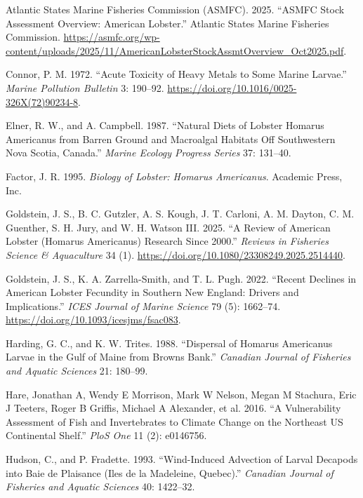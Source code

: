 \documentclass[
  letterpaper,
  DIV=11,
  numbers=noendperiod]{scrartcl}
\newlength{\cslhangindent}
\newenvironment{CSLReferences}[2] %
 {\begin{list}{}{%
  \setlength{\itemindent}{0pt}
  \setlength{\leftmargin}{0pt}
  \setlength{\parsep}{0pt}
  \ifodd #1
   \setlength{\leftmargin}{\cslhangindent}
   \setlength{\itemindent}{-1\cslhangindent}
  \fi
  \setlength{\itemsep}{#2\baselineskip}}}
 {\end{list}}
\begin{document}
\label{refs}
\begin{CSLReferences}{1}{0}
Atlantic States Marine Fisheries Commission (ASMFC). 2025. {``ASMFC
Stock Assessment Overview: American Lobster.''} Atlantic States Marine
Fisheries Commission.
\url{https://asmfc.org/wp-content/uploads/2025/11/AmericanLobsterStockAssmtOverview_Oct2025.pdf}.

Connor, P. M. 1972. {``Acute Toxicity of Heavy Metals to Some Marine
Larvae.''} \emph{Marine Pollution Bulletin} 3: 190--92.
\url{https://doi.org/10.1016/0025-326X(72)90234-8}.

Elner, R. W., and A. Campbell. 1987. {``Natural Diets of Lobster
{Homarus} Americanus from Barren Ground and Macroalgal Habitats Off
Southwestern {Nova Scotia}, {Canada}.''} \emph{Marine Ecology Progress
Series} 37: 131--40.

Factor, J. R. 1995. \emph{Biology of Lobster: {Homarus} Americanus}.
Academic Press, Inc.

Goldstein, J. S., B. C. Gutzler, A. S. Kough, J. T. Carloni, A. M.
Dayton, C. M. Guenther, S. H. Jury, and W. H. Watson III. 2025. {``A
Review of {American} Lobster ({Homarus} Americanus) Research Since
2000.''} \emph{Reviews in Fisheries Science \& Aquaculture} 34 (1).
\url{https://doi.org/10.1080/23308249.2025.2514440}.

Goldstein, J. S., K. A. Zarrella-Smith, and T. L. Pugh. 2022. {``Recent
Declines in {American} Lobster Fecundity in Southern {New England}:
Drivers and Implications.''} \emph{ICES Journal of Marine Science} 79
(5): 1662--74. \url{https://doi.org/10.1093/icesjms/fsac083}.

Harding, G. C., and K. W. Trites. 1988. {``Dispersal of {Homarus}
Americanus Larvae in the {Gulf of Maine} from {Browns Bank}.''}
\emph{Canadian Journal of Fisheries and Aquatic Sciences} 21: 180--99.

Hare, Jonathan A, Wendy E Morrison, Mark W Nelson, Megan M Stachura,
Eric J Teeters, Roger B Griffis, Michael A Alexander, et al. 2016. {``A
Vulnerability Assessment of Fish and Invertebrates to Climate Change on
the Northeast US Continental Shelf.''} \emph{PloS One} 11 (2): e0146756.

Hudson, C., and P. Fradette. 1993. {``Wind-Induced Advection of Larval
Decapods into {Baie de Plaisance} ({Iles de la Madeleine, Quebec}).''}
\emph{Canadian Journal of Fisheries and Aquatic Sciences} 40: 1422--32.


\end{CSLReferences}
\end{document}

